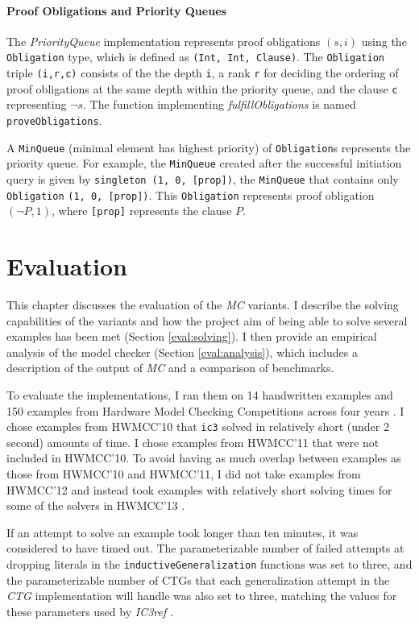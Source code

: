 \documentclass[12pt,a4paper,twoside,openright]{report}
\begin{document}
{{\subsubsection{Proof Obligations and Priority Queues}

The {\it PriorityQueue} implementation represents proof obligations $(s,i)$ using the
\verb,Obligation, type, which is defined as \verb.(Int, Int, Clause)..
The \verb,Obligation, triple
\verb.(i,r,c). consists of the the depth \verb,i,, a
rank \verb,r, for deciding the ordering of proof obligations at the same depth within the priority
queue, and the clause \verb,c, representing $\neg s$. The
function implementing {\it fulfillObligations} is named \verb,proveObligations,.

A \verb,MinQueue, (minimal element has highest priority) of \verb,Obligation,s
represents the priority queue.
For example, the \verb,MinQueue, created after the successful initiation query
is given by \verb.singleton (1, 0, [prop])., the \verb,MinQueue, that
contains only \verb,Obligation, \verb.(1, 0, [prop]).. This \verb,Obligation, represents proof obligation
$(\neg P,1)$, where \verb,[prop], represents the clause $P$.

\chapter{Evaluation}
\label{eval}

This chapter discusses the evaluation of the \emph{MC} variants.
I describe the solving capabilities of the variants
and how the project aim of being able to solve several examples has been met
(Section \ref{eval:solving}). I then provide an empirical analysis of the
model checker (Section \ref{eval:analysis}), which includes a description of
the output of \emph{MC} and a comparison of benchmarks.

To evaluate the implementations, I ran them
on 14 handwritten examples and 150 examples from
Hardware Model Checking Competitions across four years \cite{hwmcc10, hwmcc11, hwmcc13}.
I chose examples from HWMCC'10 that \verb,ic3, solved in relatively short
(under 2 second) amounts of time. I chose examples from HWMCC'11 that were
not included in HWMCC'10.
To avoid having as much overlap between examples as those from HWMCC'10 and HWMCC'11,
I did not take examples from HWMCC'12 and instead took examples
with relatively short solving times for some of the solvers in HWMCC'13
\cite{hwmcc13}.

If an attempt to solve an example took longer than ten minutes, it was considered to have timed out.
The parameterizable number of failed attempts
at dropping literals in the \verb,inductiveGeneralization, functions was set to
three, and the parameterizable number of CTGs that each generalization attempt
in the {\it CTG} implementation will handle was also set to three, matching the
values for these parameters used by \emph{IC3ref} \cite{refic3}.

}}
\end{document}
